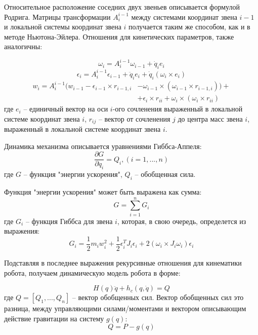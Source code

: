 Относительное расположение соседних двух звеньев описывается формулой Родрига. Матрицы трансформации $A_i^{i-1}$ между системами координат звена $i-1$ и локальной системы координат звена $i$ получается таким же способом, как и в методе Ньютона-Эйлера. Отношения для кинетических параметров, также аналогичны:

\begin{equation}
\omega_i = A_i^{i-1} \omega_{i-1} + \dot q_i e_i
\end{equation} 
\begin{equation}
\epsilon_i = A_i^{i-1} \epsilon_{i-1} + \ddot q_i e_i + \dot q_i (\omega_i \times e_i)
\end{equation}
\begin{align*}
w_i = A_i^{i-1} (w_{i-1} - \epsilon_{i-1} \times r_{i-1,i} &- \omega_{i-1} \times (\omega_{i-1} \times r_{i-1,i})) + \\
&+ \epsilon_i \times r_{ii} + \omega_i \times (\omega_i \times r_{ii})
\end{align*}
где $e_i$ -- единичный вектор на оси $i$-ого сочленения выраженный в локальной системе координат звена $i$, $r_{ij}$ -- вектор от сочленения $j$ до центра масс звена $i$, выраженный в локальной системе координат звена $i$.

Динамика механизма описывается уравнениями Гиббса-Аппеля:
\begin{equation}
\frac{\partial G}{\partial \ddot q_i} = Q_i, (i=1,...,n)
\end{equation}
где $G$ -- функция "энергии ускорения", $Q_i$ -- обобщенная сила.

Функция "энергии ускорения" может быть выражена как сумма:
\begin{equation}
G = \sum_{i=1}^n G_i
\end{equation}
где $G_i$ -- функция Гиббса для звена $i$, которая, в свою очередь, определется из выражения:
\begin{equation}
G_i = \frac{1}{2} m_i w_i^2 + \frac{1}{2} \epsilon_i^T J_i \epsilon_i + 2 (\omega_i \times J_i \omega_i) \epsilon_i
\end{equation}

Подставляя в последнее выражения рекурсивные отношения для кинематики робота, получаем динамическую модель робота в форме:

\begin{equation} \label{eq8}
H(q) \ddot q + h_c (q, \dot q) = Q
\end{equation}
где $Q = [Q_1,...,Q_n]$ -- вектор обобщенных сил. Вектор обобщенных сил это разница, между управляющими силами/моментами и вектором описывающим действие гравитации на систему $g(q)$:
\begin{equation}
Q = P - g(q)
\end{equation}

